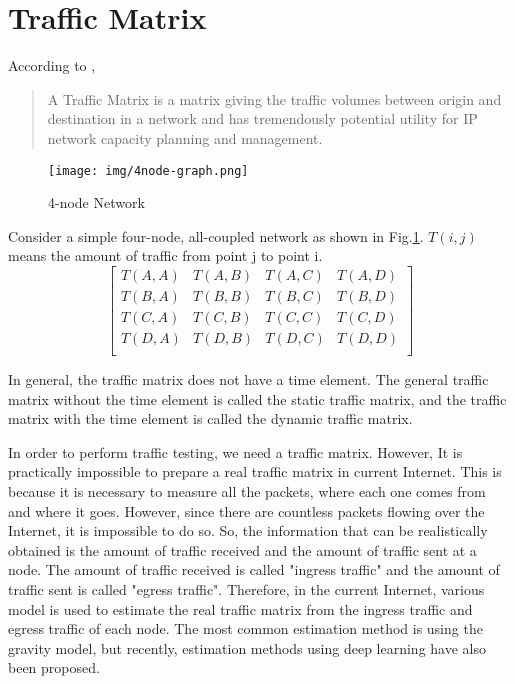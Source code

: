\section{Traffic Matrix}
According to \cite{trafficmatrix},
\begin{quote}
  A Traffic Matrix is a matrix giving the traffic volumes between origin and destination in a network and has tremendously potential utility for IP network capacity planning and management.
\end{quote}
\begin{figure}[H]
  \centering
  \texttt{[image: img/4node-graph.png]}
  \caption{4-node Network}
  \label{fig:net} 
\end{figure}

\begin{screen}
  \begin{dfn}
    Consider a simple four-node, all-coupled network as shown in Fig.\ref{fig:net}.
    $T(i,j)$ means the amount of traffic from point j to point i. 
      \begin{equation}
          \begin{bmatrix}
            T(A,A) & T(A,B) & T(A,C) & T(A,D) \\
            T(B,A) & T(B,B) & T(B,C) & T(B,D) \\
            T(C,A) & T(C,B) & T(C,C) & T(C,D) \\
            T(D,A) & T(D,B) & T(D,C) & T(D,D) \\
          \end{bmatrix}
      \end{equation}
  \end{dfn}
\end{screen}

In general, the traffic matrix does not have a time element.
The general traffic matrix without the time element is called the static traffic matrix, and the traffic matrix with the time element is called the dynamic traffic matrix\cite{nucci2005problem}.

In order to perform traffic testing, we need a traffic matrix.
However, It is practically impossible to prepare a real traffic matrix in current Internet.
This is because it is necessary to measure all the packets, where each one comes from and where it goes. 
However, since there are countless packets flowing over the Internet, it is impossible to do so.
So, the information that can be realistically obtained is the amount of traffic received and the amount of traffic sent at a node.
The amount of traffic received is called "ingress traffic" and the amount of traffic sent is called "egress traffic".
Therefore, in the current Internet, various model is used to estimate the real traffic matrix from the ingress traffic and egress traffic of each node.
The most common estimation method is using the gravity model\cite{zhang2003fast}\cite{roughan2003traffic}\cite{roughan2003experience}, but recently, estimation methods using deep learning have also been proposed\cite{kakkavas2021future}.

